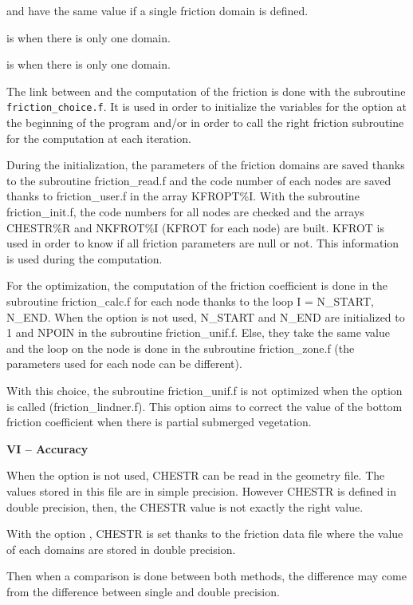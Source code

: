   and  have the same value if a single friction domain is defined.

  is  when there is only one domain.

  is  when there is only one domain.



 The link between  and the computation of the friction is done with the subroutine \verb!friction_choice.f!. It is used in order to initialize the variables for the option  at the beginning of the program and/or in order to call the right friction subroutine for the computation at each iteration.

 \textbf{}

 During the initialization, the parameters of the friction domains are saved thanks to the subroutine friction\_read.f and the code number of each nodes are saved thanks to friction\_user.f in the array KFROPT\%I. With the subroutine friction\_init.f, the code numbers for all nodes are checked and the arrays CHESTR\%R and NKFROT\%I (KFROT for each node) are built. KFROT is used in order to know if all friction parameters are null or not. This information is used during the computation.

 \textbf{}

 For the optimization, the computation of the friction coefficient is done in the subroutine friction\_calc.f for each node thanks to the loop I = N\_START, N\_END. When the option  is not used, N\_START and N\_END are initialized to 1 and NPOIN in the subroutine friction\_unif.f. Else, they take the same value and the loop on the node is done in the subroutine friction\_zone.f  (the  parameters used for each node can be different).

 With this choice, the subroutine friction\_unif.f is not optimized when the option  is called (friction\_lindner.f). This option aims to correct the value of the bottom friction coefficient when there is partial submerged vegetation.

 \textbf{VI -- Accuracy}

 When the option  is not used, CHESTR can be read in the geometry file. The values stored in this file are in simple precision. However CHESTR is defined in double precision, then, the CHESTR value is not exactly the right value.

 With the option , CHESTR is set thanks to the friction data file where the value of each domains are stored in double precision.

 Then when a comparison is done between both methods, the difference may come from the difference between single and double precision.


